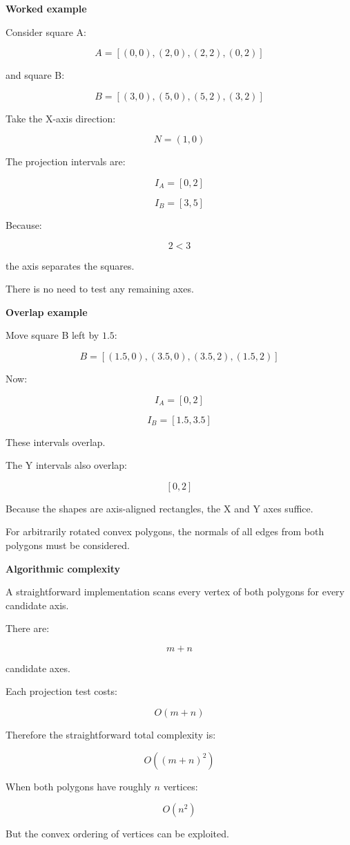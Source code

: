 \textbf{Worked example}

Consider square A:

\[
A=[(0,0),(2,0),(2,2),(0,2)]
\]

and square B:

\[
B=[(3,0),(5,0),(5,2),(3,2)]
\]

Take the X-axis direction:

\[
N=(1,0)
\]

The projection intervals are:

\[
I_A=[0,2]
\]

\[
I_B=[3,5]
\]

Because:

\[
2<3
\]

the axis separates the squares.

There is no need to test any remaining axes.

\textbf{Overlap example}

Move square B left by \(1.5\):

\[
B=[(1.5,0),(3.5,0),(3.5,2),(1.5,2)]
\]

Now:

\[
I_A=[0,2]
\]

\[
I_B=[1.5,3.5]
\]

These intervals overlap.

The Y intervals also overlap:

\[
[0,2]
\]

Because the shapes are axis-aligned rectangles, the X and Y axes suffice.

For arbitrarily rotated convex polygons, the normals of all edges from both polygons must be considered.

\textbf{Algorithmic complexity}

A straightforward implementation scans every vertex of both polygons for every candidate axis.

There are:

\[
m+n
\]

candidate axes.

Each projection test costs:

\[
O(m+n)
\]

Therefore the straightforward total complexity is:

\[
\boxed{ O((m+n)^2) }
\]

When both polygons have roughly \(n\) vertices:

\[
O(n^2)
\]

But the convex ordering of vertices can be exploited.


